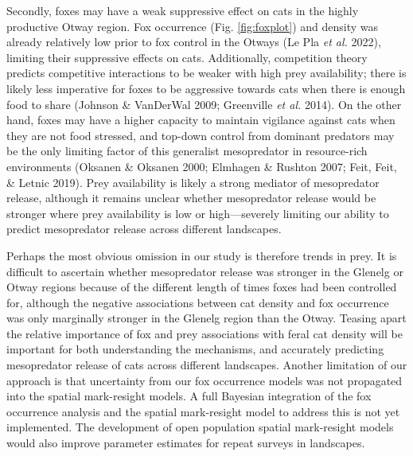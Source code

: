 \documentclass[11pt,a4paper,titlepage,twoside,openright]{style/unimelbthesis}
\begin{document}
\begin{mainmatter}
Secondly, foxes may have a weak suppressive effect on cats in the highly productive Otway region. Fox occurrence (Fig. \ref{fig:foxplot}) and density was already relatively low prior to fox control in the Otways (Le Pla \emph{et al.} 2022), limiting their suppressive effects on cats. Additionally, competition theory predicts competitive interactions to be weaker with high prey availability; there is likely less imperative for foxes to be aggressive towards cats when there is enough food to share (Johnson \& VanDerWal 2009; Greenville \emph{et al.} 2014). On the other hand, foxes may have a higher capacity to maintain vigilance against cats when they are not food stressed, and top-down control from dominant predators may be the only limiting factor of this generalist mesopredator in resource-rich environments (Oksanen \& Oksanen 2000; Elmhagen \& Rushton 2007; Feit, Feit, \& Letnic 2019). Prey availability is likely a strong mediator of mesopredator release, although it remains unclear whether mesopredator release would be stronger where prey availability is low or high---severely limiting our ability to predict mesopredator release across different landscapes.

Perhaps the most obvious omission in our study is therefore trends in prey. It is difficult to ascertain whether mesopredator release was stronger in the Glenelg or Otway regions because of the different length of times foxes had been controlled for, although the negative associations between cat density and fox occurrence was only marginally stronger in the Glenelg region than the Otway. Teasing apart the relative importance of fox and prey associations with feral cat density will be important for both understanding the mechanisms, and accurately predicting mesopredator release of cats across different landscapes. Another limitation of our approach is that uncertainty from our fox occurrence models was not propagated into the spatial mark-resight models. A full Bayesian integration of the fox occurrence analysis and the spatial mark-resight model to address this is not yet implemented. The development of open population spatial mark-resight models would also improve parameter estimates for repeat surveys in landscapes.


\end{mainmatter}
\end{document}
